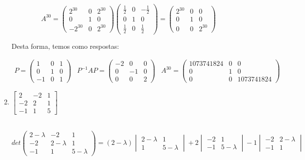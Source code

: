 \begin{enumerate}
	$$
	A^{30} = 
	\begin{pmatrix}
		2^{30} & 0 & 2^{30} \\
		0 & 1 & 0 \\
		-2^{30} & 0 & 2^{30}
	\end{pmatrix}
	\begin{pmatrix}
		\frac{1}{2} & 0 & -\frac{1}{2}\\
		0 & 1 & 0\\
		\frac{1}{2} & 0 & \frac{1}{2}
	\end{pmatrix}
	=
	\begin{pmatrix}
		2^{30} & 0 & 0 \\
		0 & 1 & 0 \\
		0 & 0 & 2^{30}
	\end{pmatrix}
	$$
	
	Desta forma, temos como respostas:
	
	$$
	\begin{array}{ccc}
		P = 
		\begin{pmatrix}
			1 & 0 & 1 \\
			0 & 1 & 0 \\
			-1 & 0 & 1
		\end{pmatrix}
		&
		P^{-1}AP = 
		\begin{pmatrix}
			-2 & 0 & 0 \\
			0 & -1 & 0 \\
			0 & 0 &  2
		\end{pmatrix}
		&
		A^{30} = 
		\begin{pmatrix}
			1073741824 & 0 & 0 \\
			0 & 1 & 0 \\
			0 & 0 & 1073741824
		\end{pmatrix}
	\end{array}				
	$$
	
	\pagebreak
	\item
	$
	\begin{bmatrix}
		2 &  -2 & 1 \\
		-2 & 2 & 1 \\
		-1 &  1 & 5
	\end{bmatrix}
	$
	\\ \\
	\solucao
	
	$$
	det
	\begin{pmatrix}
		 2 - \lambda &  -2 & 1 \\
		-2 & 2 - \lambda & 1 \\
		-1 &  1 & 5 - \lambda
	\end{pmatrix}
	=
	(2 - \lambda)
	\begin{vmatrix}
		2 - \lambda & 1 \\
		1 & 5 - \lambda	
	\end{vmatrix}
	+ 2
	\begin{vmatrix}
		-2 & 1 \\
		-1 & 5 - \lambda
	\end{vmatrix}
	- 1
	\begin{vmatrix}
		-2 & 2 - \lambda \\
		-1 & 1
	\end{vmatrix}
	$$
	

\end{enumerate}
